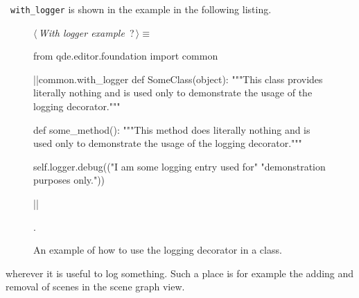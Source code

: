 \documentclass[%
    a4paper,    %
    justified,  %
    nobib,      %
    openany     %
]{tufte-book}
\begin{document}
~\verb=with_logger= is shown in the
example in the following listing.

\begin{figure}
\begin{flushleft} \small
\begin{minipage}{\linewidth}\label{scrap59}\raggedright\small
{} $\langle\,${\itshape With logger example}\nobreak\ {\footnotesize {?}}$\,\rangle\equiv$
\vspace{-1ex}
\begin{pythoncode}
from qde.editor.foundation import common

|\normalfont{}\fontfamily{}|common.with_logger
def SomeClass(object):
    """This class provides literally nothing and is used only to demonstrate the
    usage of the logging decorator."""

    def some_method():
        """This method does literally nothing and is used only to demonstrate the
        usage of the logging decorator."""

        self.logger.debug(("I am some logging entry used for"
                           "demonstration purposes only."))

|\NWsep|
\end{pythoncode}
\vspace{1.5ex}
\footnotesize
\begin{list}{}{\setlength{\itemsep}{-\parsep}\setlength{\itemindent}{-\leftmargin}}
\item {\NWtxtMacroNoRef}.

\item{}
\end{list}
\end{minipage}\vspace{4ex}
\end{flushleft}
\caption{An example of how to use the logging decorator in a class.}
\label{logging:lst:logging-example}
\end{figure}

 wherever it is useful to log
something. Such a place is for example the adding and removal of scenes in the
scene graph view.
\end{document}
